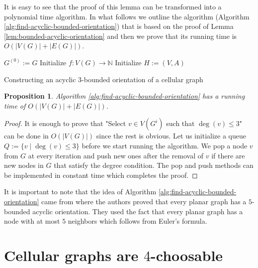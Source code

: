 \documentclass[letterpaper, 10 pt, conference]{ieeeconf}  %
\newtheorem{prop}{Proposition}
\begin{document}
It is easy to see that the proof of this lemma can be transformed into a polynomial time algorithm. In what follows we outline the algorithm (Algorithm \ref{alg:find-acyclic-bounded-orientation}) that is based on the proof of Lemma \ref{lem:bounded-acyclic-orientation} and then we prove that its running time is $O(|V(G)| + |E(G)|)$.
\begin{algorithm}\label{alg:find-acyclic-bounded-orientation}
 $G^{(0)} := G$\;
 Initialize $f \colon V(G) \to \mathbb{N}$\;
 Initialize $H:=(V,A)$\;
 \caption{Constructing an acyclic $3$-bounded orientation of a cellular graph}
\end{algorithm}
\begin{prop} Algorithm \ref{alg:find-acyclic-bounded-orientation} has a running time of $O(|V(G)| + |E(G)|)$.
\end{prop}
\begin{proof}
It is enough to prove that "Select $v \in V(G^i)$ such that $\deg(v) \leqslant 3$" can be done in $O(|V(G)|)$ since the rest is obvious. Let us initialize a queue $Q := \lbrace v \mid \deg(v) \leqslant  3\rbrace$ before we start running the algorithm. We pop a node $v$ from $G$ at every iteration and push new ones after the removal of $v$ if there are new nodes in $G$ that satisfy the degree condition. The pop and push methods can be implemented in constant time which completes the proof.
\end{proof}

It is important to note that the idea of Algorithm \ref{alg:find-acyclic-bounded-orientation} came from \cite{CHROBAK1991243} where the authors proved that every planar graph has a $5$-bounded acyclic orientation. They used the fact that every planar graph has a node with at most $5$ neighbors which follows from Euler's formula.
\section{Cellular graphs are $4$-choosable}\label{sec:4-choosable}
\end{document}
